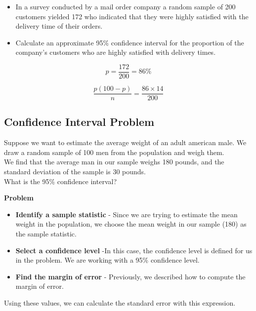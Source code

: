 \documentclass[]{report}
\begin{document}
\begin{itemize}
	\item In a survey conducted by a mail order company a random sample of 200 customers yielded 172 who indicated that they 
	were highly satisfied with the delivery time of their orders. 
	
	\item Calculate an approximate 95\% confidence interval for the proportion of the company's customers who are 
	highly satisfied with delivery times.
\end{itemize}


\[p= \frac{172}{200}= 86\%\]


\[ \frac{p(100-p)}{n} =\frac{86 \times 14}{200}\]



\subsection{Confidence Interval Problem}

Suppose we want to estimate the average weight of an adult american male. We draw a random sample of 100 men from the population  and weigh them.\\ \vspace{0.3cm} We find that the average man in our sample weighs 180 pounds, and the standard deviation of the sample is 30 pounds.\\ What is the 95\% confidence interval?



\noindent  \textbf{Problem}

\begin{itemize}
	\item
	\textbf{Identify a sample statistic} - Since we are trying to estimate the mean weight in the population, we choose the mean weight in our sample (180) as the sample statistic.
	
	
	\item \textbf{Select a confidence level}  -In this case, the confidence level is defined for us in the problem. We are working with a 95\% confidence level.
	
	
	\item \textbf{Find the margin of error} - Previously, we described how to compute the margin of error.
\end{itemize}





Using these values, we can calculate the standard error with this expression.
\end{document}

